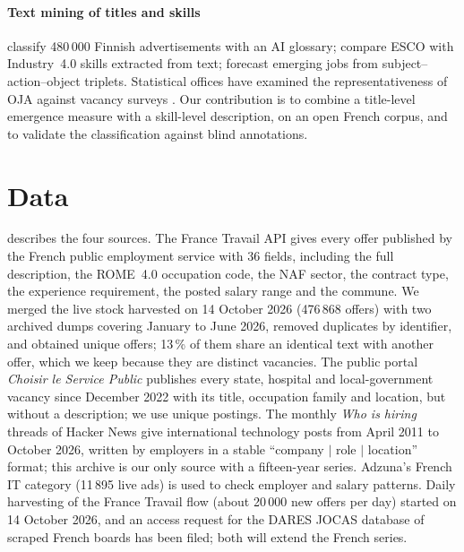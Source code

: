 \documentclass[3p,times,10pt,authoryear]{elsarticle}
\begin{document}
\paragraph{Text mining of titles and skills} \citet{back2021} classify 480\,000 Finnish advertisements with an AI glossary; \citet{chiarello2021} compare ESCO with Industry~4.0 skills extracted from text; \citet{kim2026sao} forecast emerging jobs from subject--action--object triplets. Statistical offices have examined the representativeness of OJA against vacancy surveys \citep{beresewicz2021,cedefop2019}. Our contribution is to combine a title-level emergence measure with a skill-level description, on an open French corpus, and to validate the classification against blind annotations.

\section{Data}\label{sec:data}
 describes the four sources. The France Travail API gives every offer published by the French public employment service with 36 fields, including the full description, the ROME~4.0 occupation code, the NAF sector, the contract type, the experience requirement, the posted salary range and the commune. We merged the live stock harvested on 14 October 2026 (476\,868 offers) with two archived dumps covering January to June 2026, removed duplicates by identifier, and obtained \nFT{} unique offers; 13\,\% of them share an identical text with another offer, which we keep because they are distinct vacancies. The public portal \emph{Choisir le Service Public} publishes every state, hospital and local-government vacancy since December 2022 with its title, occupation family and location, but without a description; we use \nCSP{} unique postings. The monthly \emph{Who is hiring} threads of Hacker News give \nHN{} international technology posts from April 2011 to October 2026, written by employers in a stable ``company $|$ role $|$ location'' format; this archive is our only source with a fifteen-year series. Adzuna's French IT category (11\,895 live ads) is used to check employer and salary patterns. Daily harvesting of the France Travail flow (about 20\,000 new offers per day) started on 14 October 2026, and an access request for the DARES JOCAS database of scraped French boards has been filed; both will extend the French series.
\end{document}
